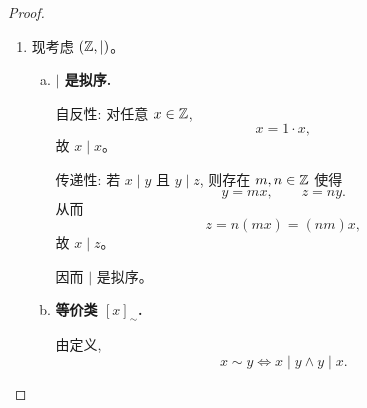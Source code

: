 \begin{proof}
\begin{enumerate}[(1)]
      \begin{enumerate}[(i)]
        \item \textbf{自反性.} 对任意 $[x]_{\sim} \in X/\sim$, 由 $\preceq$ 自反,
          \[
            x \preceq x,
          \]
          故
          \[
            [x]_{\sim} \le [x]_{\sim}.
          \]

        \item \textbf{反对称性.} 若
          \[
            [x]_{\sim} \le [y]_{\sim}
            \qquad \text{且} \qquad
            [y]_{\sim} \le [x]_{\sim},
          \]
          则
          \[
            x \preceq y
            \qquad \text{且} \qquad
            y \preceq x.
          \]
          故 $x \sim y$, 从而
          \[
            [x]_{\sim} = [y]_{\sim}.
          \]

        \item \textbf{传递性.} 若
          \[
            [x]_{\sim} \le [y]_{\sim}
            \qquad \text{且} \qquad
            [y]_{\sim} \le [z]_{\sim},
          \]
          则
          \[
            x \preceq y
            \qquad \text{且} \qquad
            y \preceq z.
          \]
          由 $\preceq$ 的传递性,
          \[
            x \preceq z.
          \]
          故
          \[
            [x]_{\sim} \le [z]_{\sim}.
          \]
      \end{enumerate}

      因而 $\le$ 是偏序关系。

    \item 现考虑 $(\mathbb{Z}, \mid)$。

      \begin{enumerate}[(a)]
        \item \textbf{$\mid$ 是拟序.}

          自反性: 对任意 $x \in \mathbb{Z}$,
          \[
            x = 1 \cdot x,
          \]
          故 $x \mid x$。

          传递性: 若 $x \mid y$ 且 $y \mid z$, 则存在 $m, n \in \mathbb{Z}$ 使得
          \[
            y = mx,
            \qquad
            z = ny.
          \]
          从而
          \[
            z = n(mx) = (nm)x,
          \]
          故 $x \mid z$。

          因而 $\mid$ 是拟序。

        \item \textbf{等价类 $[x]_{\sim}$.}

          由定义,
          \[
            x \sim y
            \iff x \mid y \land y \mid x.
          \]


\end{enumerate}
\end{enumerate}
\end{proof}
